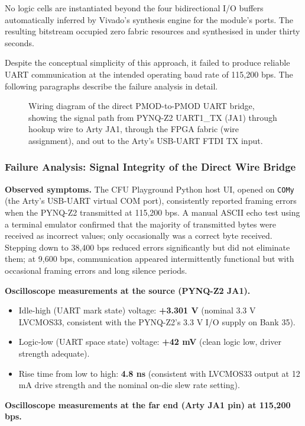 No logic cells are instantiated beyond the four bidirectional I/O buffers automatically inferred by Vivado's synthesis engine for the module's ports. The resulting bitstream occupied zero fabric resources and synthesised in under thirty seconds.

Despite the conceptual simplicity of this approach, it failed to produce reliable UART communication at the intended operating baud rate of 115,200 bps. The following paragraphs describe the failure analysis in detail.

\begin{figure}[htbp]
\centering
{}
\caption{Wiring diagram of the direct PMOD-to-PMOD UART bridge, showing the signal path from PYNQ-Z2 UART1\_TX (JA1) through hookup wire to Arty JA1, through the FPGA fabric (wire assignment), and out to the Arty's USB-UART FTDI TX input.}
\end{figure}

\subsubsection{Failure Analysis: Signal Integrity of the Direct Wire Bridge}

\textbf{Observed symptoms.} The CFU Playground Python host UI, opened on \texttt{COMy} (the Arty's USB-UART virtual COM port), consistently reported framing errors when the PYNQ-Z2 transmitted at 115,200 bps. A manual ASCII echo test using a terminal emulator confirmed that the majority of transmitted bytes were received as incorrect values; only occasionally was a correct byte received. Stepping down to 38,400 bps reduced errors significantly but did not eliminate them; at 9,600 bps, communication appeared intermittently functional but with occasional framing errors and long silence periods.

\textbf{Oscilloscope measurements at the source (PYNQ-Z2 JA1).}

\begin{itemize}
  \item Idle-high (UART mark state) voltage: \textbf{+3.301 V} (nominal 3.3 V LVCMOS33, consistent with the PYNQ-Z2's 3.3 V I/O supply on Bank 35).
  \item Logic-low (UART space state) voltage: \textbf{+42 mV} (clean logic low, driver strength adequate).
  \item Rise time from low to high: \textbf{4.8 ns} (consistent with LVCMOS33 output at 12 mA drive strength and the nominal on-die slew rate setting).
\end{itemize}
\textbf{Oscilloscope measurements at the far end (Arty JA1 pin) at 115,200 bps.}

